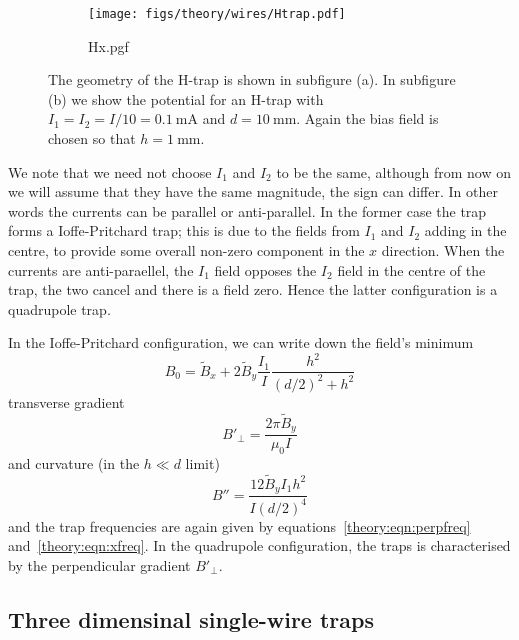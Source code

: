 \begin{figure}[htb]
  \centering
  \begin{subfigure}[b]{0.4\textwidth}
    \texttt{[image: figs/theory/wires/Htrap.pdf]}
  \end{subfigure}
  \begin{subfigure}[b]{0.4\textwidth}
    {Hx.pgf}
  \end{subfigure}
  \caption{The geometry of the H-trap is shown in subfigure (a). In subfigure
  (b) we show the potential for an H-trap with
  $I_1=I_2=I/10=\SI{0.1}{\milli\ampere}$ and $d=\SI{10}{\milli\meter}$. Again the bias field is chosen so
  that $h=\SI{1}{\milli\meter}$.}
  \label{theory:fig:Htrap}
\end{figure}

We note that we need not choose $I_1$ and $I_2$ to be the same, although from
now on we will assume that they have the same magnitude, the sign can differ.
In other words the currents can be parallel or anti-parallel. In the former
case the trap forms a Ioffe-Pritchard trap; this is due to the fields from
$I_1$ and $I_2$ adding in the centre, to provide some overall non-zero
component in the $x$ direction. When the currents are anti-paraellel, the $I_1$
field opposes the $I_2$ field in the centre of the trap, the two cancel and
there is a field zero. Hence the latter configuration is a quadrupole trap.

In the Ioffe-Pritchard configuration, we can write down the field's
minimum~\cite{PhysRevA.79.013407}
%
\begin{equation}
  B_0 = \tilde{B}_x + 2\tilde{B}_y \frac{I_1}{I}\frac{h^2}{(d/2)^2 + h^2}
\end{equation}
%
transverse gradient~\cite{PhysRevA.79.013407}
%
\begin{equation}
  B'_\perp = \frac{2\pi\tilde{B}_y}{\mu_0 I}
\end{equation}
%
and curvature (in the $h \ll d$ limit)~\cite{PhysRevA.79.013407}
%
\begin{equation}
  B'' = \frac{12\tilde{B}_y I_1 h^2}{I (d/2)^4}
\end{equation}
%
and the trap frequencies are again given by equations~\ref{theory:eqn:perpfreq}
and~\ref{theory:eqn:xfreq}. In the quadrupole configuration, the traps is
characterised by the perpendicular gradient $B'_\perp$. 

\subsection{Three dimensinal single-wire traps}

